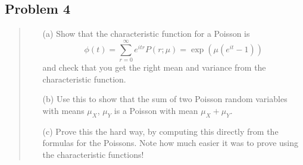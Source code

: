 \documentclass[10pt]{article}
\begin{document}
\subsection*{Problem 4}
\begin{quote}
	\begin{enumerate}
		\item[(a)] Show that the characteristic function for a Poisson is
		      $$ \phi(t)=\sum_{r=0}^{\infty}e^{itr}P(r;\mu)=\exp(\mu(e^{it}-1)) $$
		      and check that you get the right mean and variance from the characteristic function.
		\item[(b)] Use this to show that the sum of two Poisson random variables with means $\mu_{X}$, $\mu_{Y}$ is a Poisson with mean $\mu_{X}+\mu_{Y}$.
		\item[(c)] Prove this the hard way, by computing this directly from the formulas for the Poissons. Note how much easier it was to prove using the characteristic functions!
	\end{enumerate}
\end{quote}

\divider
\end{document}
